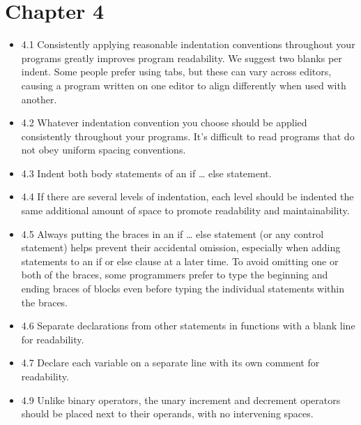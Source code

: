 \documentclass[11pt]{article}
\begin{document}
\section*{Chapter 4}
\label{sec-4}
\begin{itemize}
\item 4.1 Consistently applying reasonable indentation conventions
throughout your programs greatly improves program readability. We
suggest two blanks per indent. Some people prefer using tabs, but
these can vary across editors, causing a program written on one
editor to align differently when used with another.
\item 4.2 Whatever indentation convention you choose should be applied
consistently throughout your programs. It’s difficult to read
programs that do not obey uniform spacing conventions.
\item 4.3 Indent both body statements of an if \ldots{} else statement.
\item 4.4 If there are several levels of indentation, each level should be
indented the same additional amount of space to promote readability
and maintainability.
\item 4.5 Always putting the braces in an if \ldots{} else statement (or any
control statement) helps prevent their accidental omission,
especially when adding statements to an if or else clause at a later
time. To avoid omitting one or both of the braces, some programmers
prefer to type the beginning and ending braces of blocks even before
typing the individual statements within the braces.
\item 4.6 Separate declarations from other statements in functions with a
blank line for readability.
\item 4.7 Declare each variable on a separate line with its own comment
for readability.
\item 4.9 Unlike binary operators, the unary increment and decrement
operators should be placed next to their operands, with no
intervening spaces.
\end{itemize}
\end{document}
